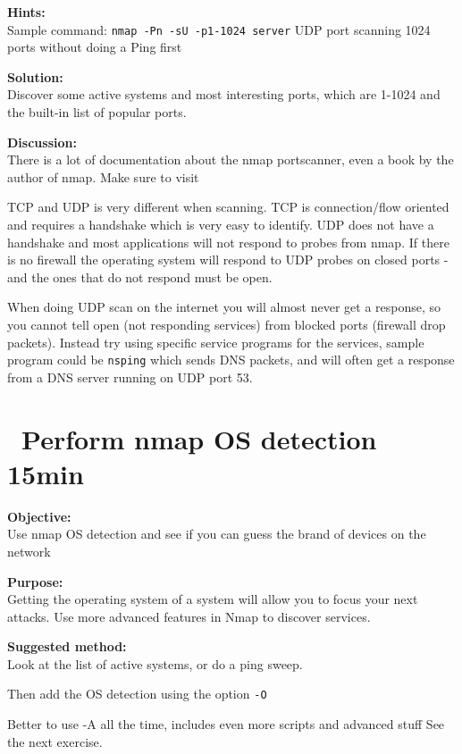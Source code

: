 \documentclass[a4paper,11pt,notitlepage]{report}
\begin{document}
{\bf Hints:} \\
Sample command: \verb+nmap -Pn -sU -p1-1024 server+ UDP port scanning
1024 ports without doing a Ping first

{\bf Solution:}\\
Discover some active systems and most interesting ports, which are 1-1024 and the built-in list of popular ports.

{\bf Discussion:}\\
There is a lot of documentation about the nmap portscanner, even a book by the author
of nmap. Make sure to visit 

TCP and UDP is very different when scanning. TCP is connection/flow oriented and requires a handshake which is very easy to identify. UDP does not have a handshake and most applications will not respond to probes from nmap. If there is no firewall the operating system will respond to UDP probes on closed ports - and the ones that do not respond must be open.

When doing UDP scan on the internet you will almost never get a response, so you cannot tell open (not responding services) from blocked ports (firewall drop packets). Instead try using specific service programs for the services, sample program could be \verb+nsping+ which sends DNS packets, and will often get a response from a DNS server running on UDP port 53.




\chapter{\faExclamationTriangle\ Perform nmap OS detection 15min}
\label{ex:nmap-os}

{\bf Objective:} \\
Use nmap OS detection and see if you can guess the brand of devices on the network

{\bf Purpose:}\\
Getting the operating system of a system will allow you to focus your next attacks. Use more advanced features in Nmap to discover services.

{\bf Suggested method:}\\
Look at the list of active systems, or do a ping sweep.

Then add the OS detection using the option \verb+-O+

Better to use -A all the time, includes even more scripts and advanced stuff
See the next exercise.
\end{document}
